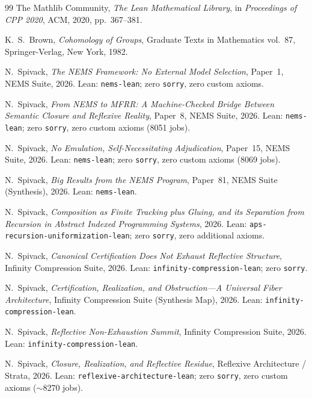 \documentclass[11pt,a4paper]{article}
\theoremstyle{plain}
\theoremstyle{definition}
\theoremstyle{remark}
\begin{document}
\begin{thebibliography}{99}
The Mathlib Community,
\emph{The Lean Mathematical Library},
in \emph{Proceedings of CPP 2020}, ACM, 2020, pp.~367--381.

K.~S.~Brown,
\emph{Cohomology of Groups},
Graduate Texts in Mathematics vol.~87, Springer-Verlag, New York, 1982.


N.~Spivack,
\emph{The NEMS Framework: No External Model Selection},
Paper~1, NEMS Suite, 2026.
Lean: \texttt{nems-lean}; zero \texttt{sorry}, zero custom axioms.

N.~Spivack,
\emph{From NEMS to MFRR: A Machine-Checked Bridge Between Semantic Closure
and Reflexive Reality},
Paper~8, NEMS Suite, 2026.
Lean: \texttt{nems-lean}; zero \texttt{sorry}, zero custom axioms (8051 jobs).

N.~Spivack,
\emph{No Emulation, Self-Necessitating Adjudication},
Paper~15, NEMS Suite, 2026.
Lean: \texttt{nems-lean}; zero \texttt{sorry}, zero custom axioms (8069 jobs).

N.~Spivack,
\emph{Big Results from the NEMS Program},
Paper~81, NEMS Suite (Synthesis), 2026.
Lean: \texttt{nems-lean}.

N.~Spivack,
\emph{Composition as Finite Tracking plus Gluing, and its Separation from
Recursion in Abstract Indexed Programming Systems},
2026.
Lean: \texttt{aps-recursion-uniformization-lean}; zero \texttt{sorry},
zero additional axioms.

N.~Spivack,
\emph{Canonical Certification Does Not Exhaust Reflective Structure},
Infinity Compression Suite, 2026.
Lean: \texttt{infinity-compression-lean}; zero \texttt{sorry}.

N.~Spivack,
\emph{Certification, Realization, and Obstruction---A Universal Fiber Architecture},
Infinity Compression Suite (Synthesis Map), 2026.
Lean: \texttt{infinity-compression-lean}.

N.~Spivack,
\emph{Reflective Non-Exhaustion Summit},
Infinity Compression Suite, 2026.
Lean: \texttt{infinity-compression-lean}.

N.~Spivack,
\emph{Closure, Realization, and Reflective Residue},
Reflexive Architecture / Strata, 2026.
Lean: \texttt{reflexive-architecture-lean}; zero \texttt{sorry},
zero custom axioms ($\sim$8270 jobs).

\end{thebibliography}
\end{document}
